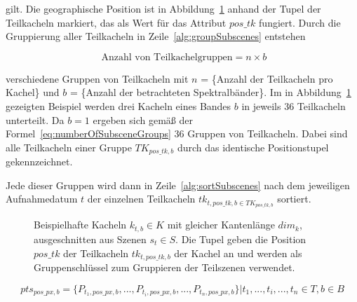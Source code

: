  gilt. Die geographische Position ist in Abbildung~\ref{fig:dataCubeSliced} anhand der Tupel der Teilkacheln markiert, das als Wert für das Attribut $pos\_tk$ fungiert. Durch die Gruppierung aller Teilkacheln in Zeile~\ref{alg:groupSubscenes} entstehen 

\begin{equation} \label{eq:numberOfSubsceneGroups}
\text{ Anzahl von Teilkachelgruppen} = n \times b
\end{equation}

 verschiedene Gruppen von Teilkacheln mit $n$ = \{Anzahl der Teilkacheln pro Kachel\} und $b$ = \{Anzahl der betrachteten Spektralbänder\}. Im in Abbildung~\ref{fig:dataCubeSliced} gezeigten Beispiel werden drei Kacheln eines Bandes $b$ in jeweils 36 Teilkacheln unterteilt. Da $b=1$ ergeben sich gemäß der Formel~\ref{eq:numberOfSubsceneGroups} 36 Gruppen von Teilkacheln. Dabei sind alle Teilkacheln einer Gruppe $TK_{pos\_tk, b}$ durch das identische Positionstupel gekennzeichnet.

Jede dieser Gruppen wird dann in Zeile~\ref{alg:sortSubscenes} nach dem jeweiligen Aufnahmedatum $t$ der einzelnen Teilkacheln $tk_{t, pos\_tk, b \in TK_{pos\_tk, b}}$ sortiert. 

\begin{figure}[H]
\centering

\caption{Beispielhafte Kacheln $k_{t, b} \in K$ mit gleicher Kantenlänge $dim_k$, ausgeschnitten aus Szenen $s_t \in S$. Die Tupel geben die Position $pos\_tk$ der Teilkacheln $tk_{t, pos\_tk, b}$ der Kachel an und werden als Gruppenschlüssel zum Gruppieren der Teilszenen verwendet.} 
\label{fig:dataCubeSliced}
\end{figure}

\begin{equation} \label{eq:pixelTimeSeries}
pts_{pos\_px, b} = \{P_{t_1, pos\_px, b}, ..., P_{t_i, pos\_px, b}, ... , P_{t_n, pos\_px, b}\} | t_1, ..., t_i, ..., t_n \in T, b\in B
\end{equation}

